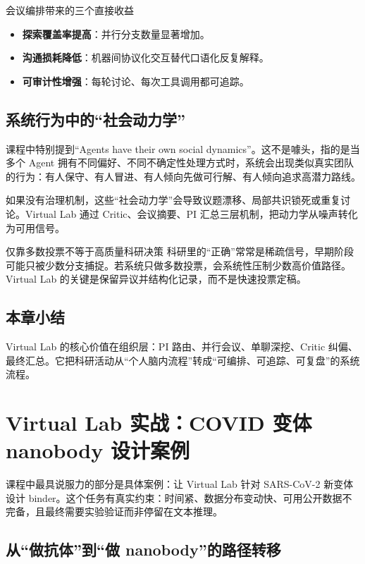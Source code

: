 \documentclass[a4paper]{article}
\begin{document}
\begin{importantbox}{会议编排带来的三个直接收益}
\begin{itemize}
    \item \textbf{探索覆盖率提高}：并行分支数量显著增加。
    \item \textbf{沟通损耗降低}：机器间协议化交互替代口语化反复解释。
    \item \textbf{可审计性增强}：每轮讨论、每次工具调用都可追踪。
\end{itemize}
\end{importantbox}

\subsection{系统行为中的``社会动力学''}

课程中特别提到``Agents have their own social dynamics''。这不是噱头，指的是当多个 Agent 拥有不同偏好、不同不确定性处理方式时，系统会出现类似真实团队的行为：有人保守、有人冒进、有人倾向先做可行解、有人倾向追求高潜力路线。

如果没有治理机制，这些``社会动力学''会导致议题漂移、局部共识锁死或重复讨论。Virtual Lab 通过 Critic、会议摘要、PI 汇总三层机制，把动力学从噪声转化为可用信号。

\begin{warningbox}{仅靠多数投票不等于高质量科研决策}
科研里的``正确''常常是稀疏信号，早期阶段可能只被少数分支捕捉。若系统只做多数投票，会系统性压制少数高价值路径。Virtual Lab 的关键是保留异议并结构化记录，而不是快速投票定稿。
\end{warningbox}

\subsection{本章小结}

Virtual Lab 的核心价值在组织层：PI 路由、并行会议、单聊深挖、Critic 纠偏、最终汇总。它把科研活动从``个人脑内流程''转成``可编排、可追踪、可复盘''的系统流程。

\section{Virtual Lab 实战：COVID 变体 nanobody 设计案例}

课程中最具说服力的部分是具体案例：让 Virtual Lab 针对 SARS-CoV-2 新变体设计 binder。这个任务有真实约束：时间紧、数据分布变动快、可用公开数据不完备，且最终需要实验验证而非停留在文本推理。

\subsection{从``做抗体''到``做 nanobody''的路径转移}
\end{document}

